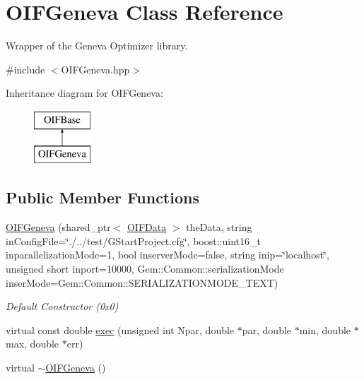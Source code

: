 \hypertarget{classOIFGeneva}{
\section{OIFGeneva Class Reference}
\label{d4/dce/classOIFGeneva}
}


Wrapper of the Geneva Optimizer library.  




{\ttfamily \#include $<$OIFGeneva.hpp$>$}

Inheritance diagram for OIFGeneva:\begin{figure}[H]
\begin{center}
\leavevmode
\includegraphics[height=2.000000cm]{d4/dce/classOIFGeneva}
\end{center}
\end{figure}
\subsection*{Public Member Functions}
\begin{DoxyCompactItemize}
\item 
\hyperlink{classOIFGeneva_a4c7ee39e6fe5ea8f7050c878369a4e94}{OIFGeneva} (shared\_\-ptr$<$ \hyperlink{classOIFData}{OIFData} $>$ theData, string inConfigFile=\char`\"{}./../test/GStartProject.cfg\char`\"{}, boost::uint16\_\-t inparallelizationMode=1, bool inserverMode=false, string inip=\char`\"{}localhost\char`\"{}, unsigned short inport=10000, Gem::Common::serializationMode inserMode=Gem::Common::SERIALIZATIONMODE\_\-TEXT)
\begin{DoxyCompactList}\small\item\em Default Constructor (0x0) \end{DoxyCompactList}\item 
virtual const double \hyperlink{classOIFGeneva_a1a5cf2ace477bd40ce1c4848365a2f13}{exec} (unsigned int Npar, double $\ast$par, double $\ast$min, double $\ast$max, double $\ast$err)
\item 
virtual \hyperlink{classOIFGeneva_a72a8b0d30f8ef7d1d7dbe51a15a412e3}{$\sim$OIFGeneva} ()
\end{DoxyCompactItemize}

